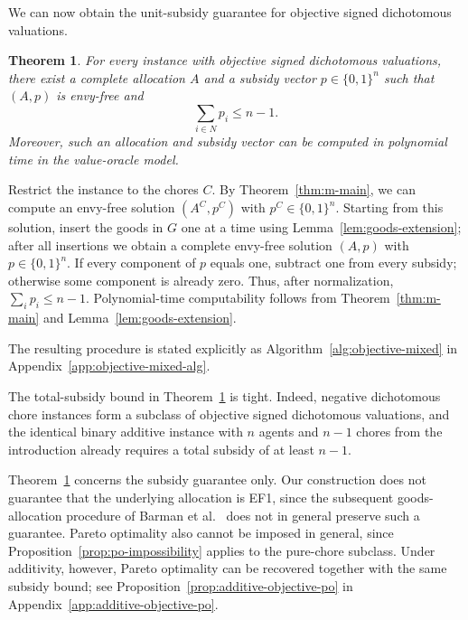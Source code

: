 \documentclass[11pt]{article}
\makeatletter
\theoremstyle{plain}
\newtheorem{theorem}{Theorem}
\theoremstyle{plain}
\renewenvironment{proof}[1][\proofname]{\par
  \pushQED{\qed}%
  \normalfont \topsep6\p@\@plus6\p@\relax
  \trivlist
  \item[\hskip\labelsep\bfseries #1\@addpunct{}]\ignorespaces
}{%
  \popQED\endtrivlist\@endpefalse
}
\makeatother
\begin{document}
We can now obtain the unit-subsidy guarantee for objective signed dichotomous valuations.

\begin{theorem}
\label{thm:objective-mixed}
For every instance with objective signed dichotomous valuations, there exist a complete allocation $A$ and a subsidy vector $p\in\{0,1\}^n$ such that $(A,p)$ is envy-free and
\[
\sum_{i\in N} p_i\leq n-1.
\]
Moreover, such an allocation and subsidy vector can be computed in polynomial time in the value-oracle model.
\end{theorem}

\begin{proof}
Restrict the instance to the chores $C$. By Theorem~\ref{thm:m-main}, we can compute an envy-free solution $(A^C,p^C)$ with $p^C\in\{0,1\}^n$. Starting from this solution, insert the goods in $G$ one at a time using Lemma~\ref{lem:goods-extension}; after all insertions we obtain a complete envy-free solution $(A,p)$ with $p\in\{0,1\}^n$. If every component of $p$ equals one, subtract one from every subsidy; otherwise some component is already zero. Thus, after normalization, $\sum_i p_i\le n-1$. Polynomial-time computability follows from Theorem~\ref{thm:m-main} and Lemma~\ref{lem:goods-extension}.
\end{proof}

The resulting procedure is stated explicitly as Algorithm~\ref{alg:objective-mixed} in Appendix~\ref{app:objective-mixed-alg}.

The total-subsidy bound in Theorem~\ref{thm:objective-mixed} is tight. Indeed, negative dichotomous chore instances form a subclass of objective signed dichotomous valuations, and the identical binary additive instance with $n$ agents and $n-1$ chores from the introduction already requires a total subsidy of at least $n-1$.

Theorem~\ref{thm:objective-mixed} concerns the subsidy guarantee only. Our construction does not guarantee that the underlying allocation is EF1, since the subsequent goods-allocation procedure of Barman et al.~\cite{BKNS22} does not in general preserve such a guarantee. Pareto optimality also cannot be imposed in general, since Proposition~\ref{prop:po-impossibility} applies to the pure-chore subclass. Under additivity, however, Pareto optimality can be recovered together with the same subsidy bound; see Proposition~\ref{prop:additive-objective-po} in Appendix~\ref{app:additive-objective-po}.


\appendix
\end{document}
